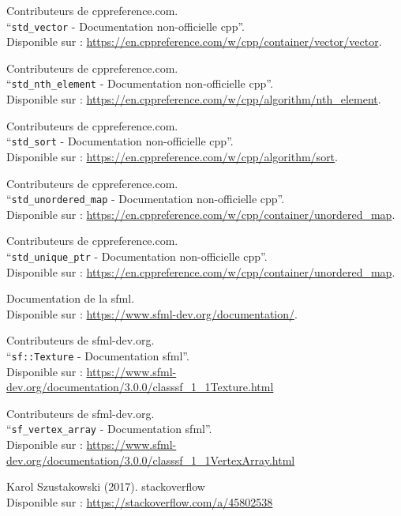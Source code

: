 \documentclass[a4paper,12pt]{report}
\begin{document}
\begin{thebibliography}{9}
        Contributeurs de cppreference.com.\\
        ``\texttt{\gls{std_vector}} - Documentation non-officielle \gls{cpp}''.\\
        Disponible sur : \url{https://en.cppreference.com/w/cpp/container/vector/vector}.

        Contributeurs de cppreference.com.\\
        ``\texttt{\gls{std_nth_element}} - Documentation non-officielle \gls{cpp}''.\\
        Disponible sur : \url{https://en.cppreference.com/w/cpp/algorithm/nth_element}.

        Contributeurs de cppreference.com.\\
        ``\texttt{\gls{std_sort}} - Documentation non-officielle \gls{cpp}''.\\
        Disponible sur : \url{https://en.cppreference.com/w/cpp/algorithm/sort}.

        Contributeurs de cppreference.com.\\
        ``\texttt{\gls{std_unordered_map}} - Documentation non-officielle \gls{cpp}''.\\
        Disponible sur : \url{https://en.cppreference.com/w/cpp/container/unordered_map}.

        Contributeurs de cppreference.com.\\
        ``\texttt{\gls{std_unique_ptr}} - Documentation non-officielle \gls{cpp}''.\\
        Disponible sur : \url{https://en.cppreference.com/w/cpp/container/unordered_map}.

        Documentation de la \gls{sfml}. \\
        Disponible sur : \url{https://www.sfml-dev.org/documentation/}.

        Contributeurs de sfml-dev.org.\\
        ``\texttt{sf::Texture} - Documentation \gls{sfml}''.\\
        Disponible sur : \url{https://www.sfml-dev.org/documentation/3.0.0/classsf_1_1Texture.html}

        Contributeurs de sfml-dev.org.\\
        ``\texttt{\gls{sf_vertex_array}} - Documentation \gls{sfml}''.\\
        Disponible sur : \url{https://www.sfml-dev.org/documentation/3.0.0/classsf_1_1VertexArray.html}

        Karol Szustakowski (2017).
        \gls{stackoverflow} \\
        Disponible sur : \url{https://stackoverflow.com/a/45802538}
    \end{thebibliography}
\end{document}
